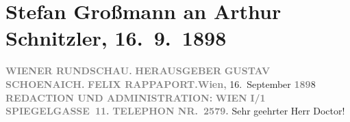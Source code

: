 

         
         \renewcommand{\erwaehntePersonen}{Personen: Otto Brahm, Stefan Großmann, Felix Rappaport, Gustav Schönaich}
         \renewcommand{\erwaehnteInstitutionen}{Institutionen: Deutsches Theater Berlin, Wiener Rundschau}
         \renewcommand{\erwaehnteOrte}{Orte: Spiegelgasse, Wien}
         \renewcommand{\erwaehnteWerke}{Werke: Der grüne Kakadu – Paracelsus – Die Gefährtin. Drei Einakter}
               \section[Stefan Großmann an Arthur Schnitzler, 16. 9. 1898]{ Stefan Großmann an Arthur Schnitzler, 16. 9. 1898}\nopagebreak{}\rehead{ }\begin{ledgroupsized}[t]{13cm}\normalsize\beginnumbering \toendnotes[C]{\smallbreak\pagebreak[2]} 
\toendnotes[C]{\smallbreak}\pstart
           \noindent{}{\pb}\textcolor{gray}{\textbf{WIENER RUNDSCHAU.}}\pend
           \pstart
           \textcolor{gray}{\textbf{HERAUSGEBER}}\pend
           \pstart
           \textcolor{gray}{\textbf{GUSTAV SCHOENAICH.}}\pend
           \pstart
           \textcolor{gray}{\textbf{FELIX RAPPAPORT.}}\hfill \textcolor{gray}{\textbf{Wien,}}{ }16. September \textcolor{gray}{\textbf{189}}8\pend
           \pstart
           \textcolor{gray}{\textbf{REDACTION UND ADMINISTRATION:}}\pend
           \pstart
           \textcolor{gray}{\textbf{WIEN}}\pend
           \pstart
           \textcolor{gray}{\textbf{I/1 SPIEGELGASSE 11.}}\pend
           \pstart
           \textcolor{gray}{\textbf{TELEPHON NR. 2579.}}\pend
           \pstart\center{}Sehr geehrter Herr Doctor!\pend\pstart

\end{ledgroupsized}
